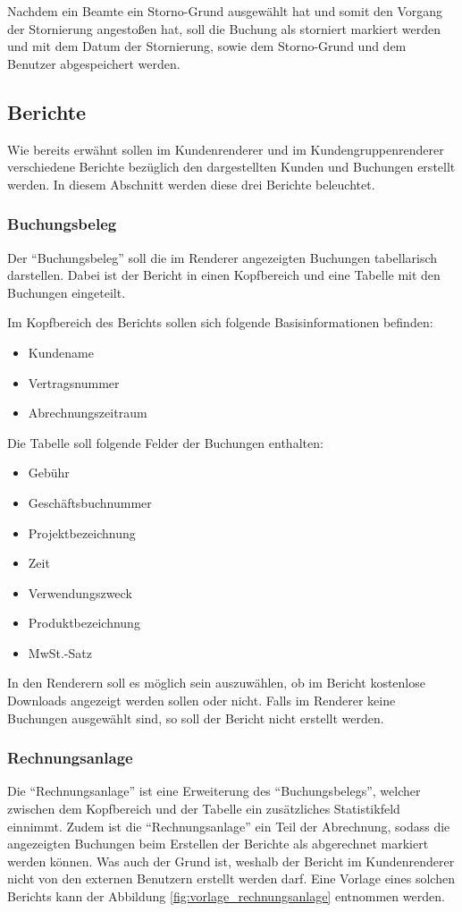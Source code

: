Nachdem ein Beamte ein Storno-Grund ausgewählt hat und somit den Vorgang der Stornierung angestoßen hat, soll die Buchung als storniert markiert werden und mit dem Datum der Stornierung, sowie dem Storno-Grund und dem Benutzer abgespeichert werden.

\subsection{Berichte} \label{subsec:berichte}
Wie bereits erwähnt sollen im Kundenrenderer und im Kundengruppenrenderer verschiedene Berichte bezüglich den dargestellten Kunden und Buchungen erstellt werden. In diesem Abschnitt werden diese drei Berichte beleuchtet.

\subsubsection{Buchungsbeleg}
Der \enquote{Buchungsbeleg} soll die im Renderer angezeigten Buchungen tabellarisch darstellen.
Dabei ist der Bericht in einen Kopfbereich und eine Tabelle mit den Buchungen eingeteilt.

Im Kopfbereich des Berichts sollen sich folgende Basisinformationen befinden:
\begin{itemize}
  \item Kundename 
  \item Vertragsnummer
  \item Abrechnungszeitraum
\end{itemize}  
Die Tabelle soll folgende Felder der Buchungen enthalten:
\begin{itemize}
 \item Gebühr
 \item Geschäftsbuchnummer 
 \item Projektbezeichnung
 \item Zeit
 \item Verwendungszweck
 \item Produktbezeichnung
 \item MwSt.-Satz
\end{itemize}

In den Renderern soll es möglich sein auszuwählen, ob im Bericht kostenlose Downloads angezeigt werden sollen oder nicht.
Falls im Renderer keine Buchungen ausgewählt sind, so soll der Bericht nicht erstellt werden.

\subsubsection{Rechnungsanlage}
Die \enquote{Rechnungsanlage} ist eine Erweiterung des \enquote{Buchungsbelegs}, welcher zwischen dem Kopfbereich und der Tabelle ein zusätzliches Statistikfeld einnimmt.
Zudem ist die \enquote{Rechnungsanlage} ein Teil der Abrechnung, sodass die angezeigten Buchungen beim Erstellen der Berichte als abgerechnet markiert werden können.
Was auch der Grund ist, weshalb der Bericht im Kundenrenderer nicht von den externen Benutzern erstellt werden darf.
Eine Vorlage eines solchen Berichts kann der Abbildung \vref{fig:vorlage_rechnungsanlage} entnommen werden.

